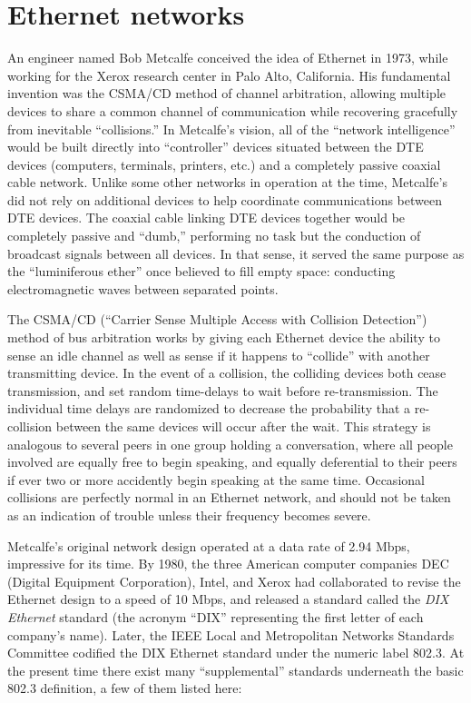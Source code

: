 \filbreak
\section{Ethernet networks}

An engineer named Bob Metcalfe conceived the idea of Ethernet in 1973, while working for the Xerox research center in Palo Alto, California.  His fundamental invention was the CSMA/CD method of channel arbitration, allowing multiple devices to share a common channel of communication while recovering gracefully from inevitable ``collisions.''  In Metcalfe's vision, all of the ``network intelligence'' would be built directly into ``controller'' devices situated between the DTE devices (computers, terminals, printers, etc.) and a completely passive coaxial cable network.  Unlike some other networks in operation at the time, Metcalfe's did not rely on additional devices to help coordinate communications between DTE devices.  The coaxial cable linking DTE devices together would be completely passive and ``dumb,'' performing no task but the conduction of broadcast signals between all devices.  In that sense, it served the same purpose as the ``luminiferous ether'' once believed to fill empty space: conducting electromagnetic waves between separated points.    

The CSMA/CD (``Carrier Sense Multiple Access with Collision Detection'') method of bus arbitration works by giving each Ethernet device the ability to sense an idle channel as well as sense if it happens to ``collide'' with another transmitting device.  In the event of a collision, the colliding devices both cease transmission, and set random time-delays to wait before re-transmission.  The individual time delays are randomized to decrease the probability that a re-collision between the same devices will occur after the wait.  This strategy is analogous to several peers in one group holding a conversation, where all people involved are equally free to begin speaking, and equally deferential to their peers if ever two or more accidently begin speaking at the same time.  Occasional collisions are perfectly normal in an Ethernet network, and should not be taken as an indication of trouble unless their frequency becomes severe.  

Metcalfe's original network design operated at a data rate of 2.94 Mbps, impressive for its time.  By 1980, the three American computer companies DEC (Digital Equipment Corporation), Intel, and Xerox had collaborated to revise the Ethernet design to a speed of 10 Mbps, and released a standard called the \textit{DIX Ethernet} standard (the acronym ``DIX'' representing the first letter of each company's name).  Later, the IEEE Local and Metropolitan Networks Standards Committee codified the DIX Ethernet standard under the numeric label 802.3.  At the present time there exist many ``supplemental'' standards underneath the basic 802.3 definition, a few of them listed here:  

